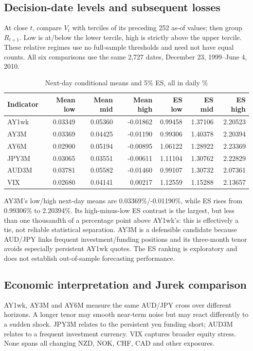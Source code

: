 \documentclass[10pt,letterpaper]{article}
\newcommand{\rLowES}{0.99306}
\newcommand{\rHighES}{2.20394}
\newcommand{\rLowMean}{0.03369}
\newcommand{\rHighMean}{-0.01190}
\begin{document}
\subsection{Decision-date levels and subsequent losses}
At close $t$, compare $V_t$ with terciles of its preceding 252 as-of values; then group
$R_{t+1}$. Low is at/below the lower tercile, high is strictly above the upper tercile.
These relative regimes use no full-sample thresholds and need not have equal counts.
All six comparisons use the same 2,727 dates, December 23, 1999--June 4, 2010.
\begin{table}[H]\centering\small\caption{Next-day conditional means and 5\% ES, all in daily \%}
\begin{tabular}{lrrrrrr}\toprule
Indicator & Mean low & Mean mid & Mean high & ES low & ES mid & ES high\\\midrule
AY1wk & 0.03349 & 0.05360 & -0.01862 & 0.99458 & 1.37106 & 2.20523\\
AY3M & 0.03369 & 0.04425 & -0.01190 & 0.99306 & 1.40378 & 2.20394\\
AY6M & 0.02900 & 0.05194 & -0.00895 & 1.06122 & 1.28922 & 2.23369\\
JPY3M & 0.03065 & 0.03551 & -0.00611 & 1.11104 & 1.30762 & 2.22829\\
AUD3M & 0.03781 & 0.05582 & -0.01460 & 0.99107 & 1.30732 & 2.07361\\
VIX & 0.02680 & 0.04141 & 0.00217 & 1.12559 & 1.15288 & 2.13657\\
\bottomrule\end{tabular}\end{table}

AY3M's low/high next-day means are \rLowMean{}\%/\rHighMean{}\%, while ES rises from
\rLowES{}\% to \rHighES{}\%. Its high-minus-low ES contrast is the largest, but less than one thousandth of a percentage point above AY1wk's: this is effectively a tie, not reliable statistical
separation. AY3M is a defensible candidate because AUD/JPY links frequent investment/funding
positions and its three-month tenor avoids especially persistent AY1wk quotes. The ES ranking
is exploratory and does not establish out-of-sample forecasting performance.
\newpage
\subsection{Economic interpretation and Jurek comparison}
AY1wk, AY3M and AY6M measure the same AUD/JPY cross over different horizons. A longer tenor
may smooth near-term noise but may react differently to a sudden shock. JPY3M relates to the
persistent yen funding short; AUD3M relates to a frequent investment currency. VIX captures
broader equity stress. None spans all changing NZD, NOK, CHF, CAD and other exposures.
\end{document}
